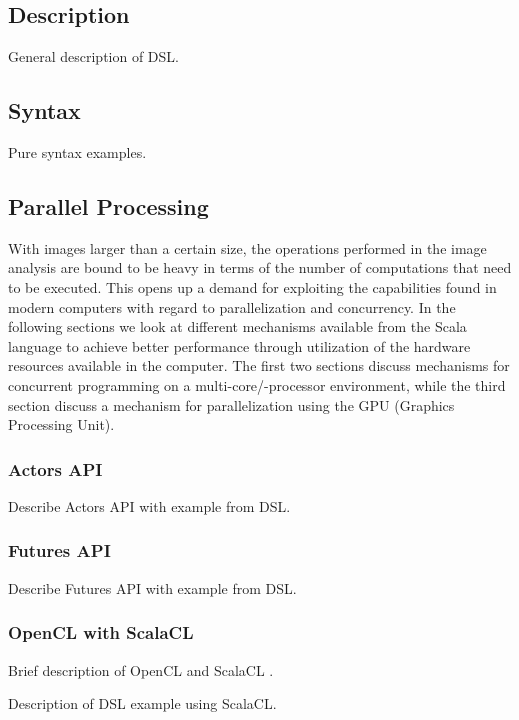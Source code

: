 \documentclass[a4paper,english]{report}
\begin{document}
\subsection{Description}

General description of DSL.

\subsection{Syntax}

Pure syntax examples.

\subsection{Parallel Processing}

With images larger than a certain size, the operations performed in
the image analysis are bound to be heavy in terms of the number of
computations that need to be executed. This opens up a demand for
exploiting the capabilities found in modern computers with regard to
parallelization and concurrency. In the following sections we look at
different mechanisms available from the Scala language to achieve
better performance through utilization of the hardware resources
available in the computer. The first two sections discuss mechanisms
for concurrent programming on a multi-core/-processor environment,
while the third section discuss a mechanism for parallelization using
the GPU (Graphics Processing Unit).

\subsubsection{Actors API}
\label{sec:actors}

Describe Actors API with example from DSL.

\subsubsection{Futures API}
\label{sec:futures}

Describe Futures API with example from DSL.

\subsubsection{OpenCL with ScalaCL}
\label{sec:opencl}

Brief description of OpenCL \cite{opencl} and ScalaCL \cite{scalacl}.

Description of DSL example using ScalaCL.
\end{document}
